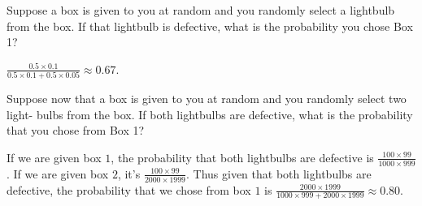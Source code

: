 \documentclass[11pt]{article}
\begin{document}
\begin{Parts}
    
    \Part Suppose a box is given to you at random and you randomly select a lightbulb from the box. If that lightbulb 
          is defective, what is the probability you chose Box 1?
    \begin{Answer}
        $\frac{0.5 \times 0.1}{0.5 \times 0.1 + 0.5 \times 0.05} \approx 0.67$. 
    \end{Answer}

    \Part Suppose now that a box is given to you at random and you randomly select two light- bulbs from the box. If 
    both lightbulbs are defective, what is the probability that you chose from Box 1?
    \begin{Answer}
        If we are given box $1$, the probability that both lightbulbs are defective is $\frac{100 \times 99}{1000 \times 999}$.
        If we are given box $2$, it's $\frac{100 \times 99}{2000 \times 1999}$. Thus given that both lightbulbs are defective, 
        the probability that we chose from box $1$ is $\frac{2000 \times 1999}{1000 \times 999 + 2000 \times 1999} \approx 0.80$. 
    \end{Answer}

\end{Parts}

\newpage
{}
\end{document}
